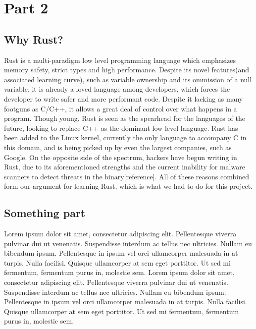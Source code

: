 \documentclass[../main.tex]{subfiles}
\begin{document}
	\chapter{Part 2}


	\section{Why Rust?}


Rust is a multi-paradigm low level programming language which emphasizes memory safety, strict types and high performance. Despite its novel features(and associated learning curve),
such as variable ownership and its ommission of a null variable, it is already a loved language among developers, which forces the developer to write safer and more performant code.
Despite it lacking as many footguns as C/C++, it allows a great deal of control over what happens in a program. Though young, Rust is seen as the spearhead for the languages of the 
future, looking to replace C++ as the dominant low level language. Rust has been added to the Linux kernel, currently the only language to accompany C in this domain, and is being 
picked up by even the largest companies, such as Google. On the opposite side of the spectrum, hackers have begun writing in Rust, due to its aforementioned strengths and the 
current inability for malware scanners to detect threats in the binary[reference]. All of these reasons combined form our argument for learning Rust, which is what we had to do for
this project.

	\vspace{10pt}


	\section{Something part}


Lorem ipsum dolor sit amet, consectetur adipiscing elit. Pellentesque viverra pulvinar dui ut venenatis.
Suspendisse interdum ac tellus nec ultricies. Nullam eu bibendum ipsum. Pellentesque in ipsum vel orci 
ullamcorper malesuada in at turpis. Nulla facilisi. Quisque ullamcorper at sem eget porttitor. Ut sed mi fermentum, 
fermentum purus in, molestie sem.
Lorem ipsum dolor sit amet, consectetur adipiscing elit. Pellentesque viverra pulvinar dui ut venenatis.
Suspendisse interdum ac tellus nec ultricies. Nullam eu bibendum ipsum. Pellentesque in ipsum vel orci 
ullamcorper malesuada in at turpis. Nulla facilisi. Quisque ullamcorper at sem eget porttitor. Ut sed mi fermentum, 
fermentum purus in, molestie sem.
\end{document}
